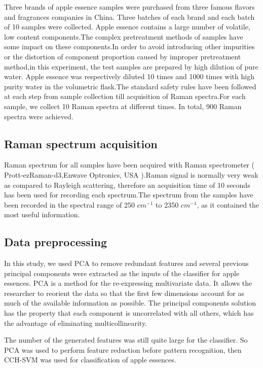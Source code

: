 \documentclass[a4paper]{article}
\begin{document}
Three brands of apple essence samples were purchased from three famous flavors and fragrances companies in China. Three batches of each brand and  each batch of 10 samples were collected. Apple essence contains a large number of volatile, low content components.The complex pretreatment methods of samples have some impact on these components.In order to avoid introducing other impurities or the distortion of component proportion caused by improper pretreatment method,in this experiment, the test samples are prepared by high dilution of pure water. Apple essence was respectively diluted 10 times and 1000 times with high purity water in the volumetric flask.The  standard  safety  rules  have  been  followed  at  each step from sample collection till acquisition of Raman spectra.For each sample, we collect 10 Raman spectra at different times. In total, 900 Raman spectra were achieved.


\subsection{Raman spectrum acquisition}%
Raman spectrum for all samples have been acquired with Raman spectrometer ( Prott-ezRaman-d3,Enwave Optronics, USA ).Raman  signal  is  normally  very  weak  as  compared  to  Rayleigh  scattering,  therefore  an acquisition time of 10 seconds has been used for recording each spectrum.The spectrum from the  samples  have  been  recorded  in  the  spectral  range  of  250 $cm^{−1}$  to  2350 $cm^{−1}$,  as  it contained the most useful information.

\subsection{Data preprocessing}%
In this study, we used PCA to remove redundant features and several previous principal components were extracted as the inputs of the classifier for apple essences.
PCA is  a  method  for  the  re-expressing  multivariate  data. It  allows  the researcher to reorient the data so that the first few dimensions account for as much  of  the  available  information  as  possible.  The  principal  components solution has the property that each component is uncorrelated with all others, which  has  the  advantage  of  eliminating  multicollinearity.

The number of the generated features was still quite large for  the  classifier.  So  PCA  was  used  to  perform  feature reduction  before  pattern  recognition, then  CCH-SVM  was  used  for  classification  of  apple essences.
\end{document}
